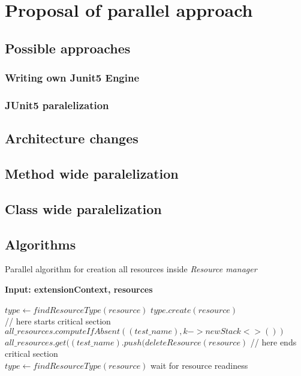 \chapter{Proposal of parallel approach}

\section{Possible approaches}

\subsection{Writing own Junit5 Engine}
\subsection{JUnit5 paralelization}

\section{Architecture changes} %
\section{Method wide paralelization}
\section{Class wide paralelization}
\section{Algorithms} 

\begin{algorithm}[H]
\label{01:alg:dsdsd}
\caption{Parallel algorithm for creation all resources inside \emph{Resource manager}}

\hspace*{\algorithmicindent} \textbf{Input: extensionContext, resources}

    \begin{algorithmic}[1]
            \State $type \gets findResourceType(resource)$
            \State $type.create(resource)$
            \\
            \State // here starts critical section
            \State $all\_resources.computeIfAbsent((test\_name), k -> new Stack<>())$
            \State $all\_resources.get((test\_name).push(deleteResource(resource)$
            \State // here ends critical section
            \\
                \State $type \gets findResourceType(resource)$
                \State wait for resource readiness
            \EndForEach
        \EndIf
        \EndForEach
    \end{algorithmic}
\end{algorithm}


